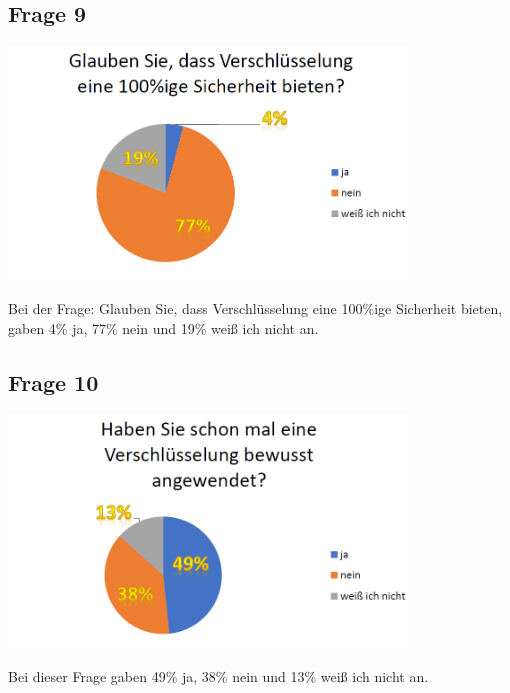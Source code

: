 \subsection{Frage 9}
\begin{center}
	\includegraphics[width=0.8\textwidth]{./img/umfrage9}
\end{center}
Bei der Frage: Glauben Sie, dass Verschlüsselung eine 100\%ige Sicherheit bieten, gaben 4\% ja, 77\% nein und 19\% weiß ich nicht an.

\subsection{Frage 10}
\begin{center}
	\includegraphics[width=0.8\textwidth]{./img/umfrage10}
\end{center}
Bei dieser Frage gaben 49\% ja, 38\% nein und 13\% weiß ich nicht an.
